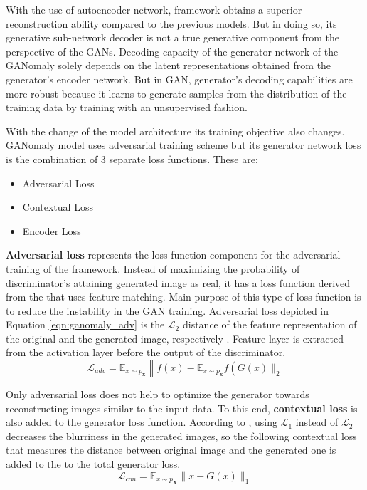  With the use of autoencoder network, framework obtains a superior reconstruction ability
compared to the previous models. But in doing so, its generative sub-network decoder is not a true
generative component from the perspective of the GANs. Decoding capacity of the 
generator network of the GANomaly solely depends on the latent representations obtained from the generator's encoder
network. But in GAN, generator's decoding capabilities are more robust because it learns to generate samples from the 
distribution of the training data by training with an unsupervised fashion.

 With the change of the model architecture its training objective also changes. GANomaly model uses adversarial
training scheme but its generator network loss is the combination of 3 separate loss functions. These
are:
\begin{itemize}
   \item Adversarial Loss
   \item Contextual Loss
   \item Encoder Loss 
\end{itemize} 

\textbf{Adversarial loss} represents the loss function component for the adversarial training of the
framework. Instead of maximizing the probability of discriminator's attaining generated image as
real, it has a loss function derived from the \cite{fm} that uses feature matching. Main purpose
of this type of loss function is to reduce the instability in the GAN training. Adversarial loss
depicted in Equation \ref{eqn:ganomaly_adv} is the $\mathcal{L}_{2}$ distance of the feature
representation of the original and the generated image, respectively \cite{Akay2018GANomalySA}.
Feature layer is extracted from the activation layer before the output of the discriminator.  
\begin{equation}
    \label{eqn:ganomaly_adv}
    \mathcal{L}_{a d v}=\mathbb{E}_{x \sim p_{\mathbf{x}}}\left\|f(x)-\mathbb{E}_{x \sim p_{\mathbf{x}}} f\left(G(x) \|_{2}\right.\right. 
\end{equation}

Only adversarial loss does not help to optimize the generator towards reconstructing images similar
to the input data. To this end, \textbf{contextual loss} is also added to the generator loss function.
According to \cite{Isola2017ImagetoImageTW}, using $\mathcal{L}_1$ instead of $\mathcal{L}_2$
decreases the blurriness in the generated images, so the following contextual loss that measures the
distance between original image and the generated one is added to the to the total generator loss.
\begin{equation}
    \mathcal{L}_{c o n}=\mathbb{E}_{x \sim p_{\mathbf{X}}}\|x-G(x)\|_{1} 
\end{equation}

